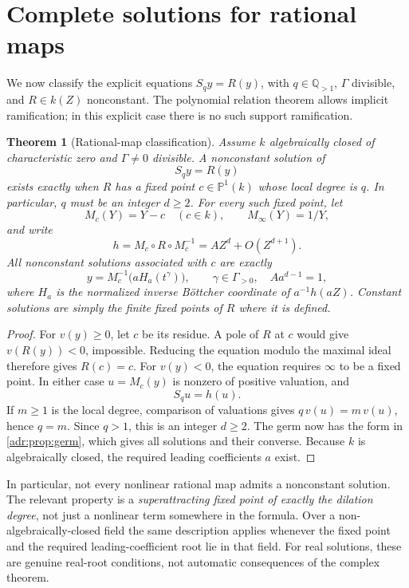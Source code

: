 \documentclass[11pt,letterpaper]{article}
\numberwithin{equation}{section}
\newtheorem{theorem}{Theorem}[section]
\theoremstyle{definition}
\theoremstyle{remark}
\newcommand{\Q}{\mathbb Q}
\begin{document}
\section{Complete solutions for rational maps}\label{adr:sec:rational}

We now classify the explicit equations $S_qy=R(y)$, with
$q\in\Q_{>1}$, $\Gamma$ divisible, and $R\in k(Z)$ nonconstant.
The polynomial relation theorem allows implicit ramification; in this
explicit case there is no such support ramification.

\begin{theorem}[Rational-map classification]\label{adr:thm:rational}
Assume $k$ algebraically closed of characteristic zero and $\Gamma\ne0$
divisible. A nonconstant solution of
\begin{equation}\label{adr:eq:rational}
 S_qy=R(y)
\end{equation}
exists exactly when $R$ has a fixed point $c\in\mathbb P^1(k)$ whose
local degree is $q$. In particular, $q$ must be an integer $d\ge2$.
For every such fixed point, let
\[
 M_c(Y)=Y-c\quad(c\in k),\qquad M_\infty(Y)=1/Y,
\]
and write
\[
 h=M_c\circ R\circ M_c^{-1}
   =A Z^d+O(Z^{d+1}).
\]
All nonconstant solutions associated with $c$ are exactly
\begin{equation}\label{adr:eq:rational-solutions}
 y=M_c^{-1}\bigl(aH_a(t^\gamma)\bigr),
 \qquad \gamma\in\Gamma_{>0},\quad Aa^{d-1}=1,
\end{equation}
where $H_a$ is the normalized inverse B\"ottcher coordinate of
$a^{-1}h(aZ)$. Constant solutions are simply the finite fixed points of
$R$ where it is defined.
\end{theorem}
\begin{proof}
For $v(y)\ge0$, let $c$ be its residue. A pole of $R$ at $c$ would give
$v(R(y))<0$, impossible. Reducing the equation modulo the maximal ideal
therefore gives $R(c)=c$. For $v(y)<0$, the equation requires $\infty$
to be a fixed point. In either case $u=M_c(y)$ is nonzero of positive
valuation, and
\[
 S_qu=h(u).
\]
If $m\ge1$ is the local degree, comparison of valuations gives
$q\,v(u)=m\,v(u)$, hence $q=m$. Since $q>1$, this is an integer $d\ge2$.
The germ now has the form in \cref{adr:prop:germ}, which gives all solutions
and their converse. Because $k$ is algebraically closed, the required
leading coefficients $a$ exist.
\end{proof}

In particular, not every nonlinear rational map admits a nonconstant
solution. The relevant property is a \emph{superattracting fixed point
of exactly the dilation degree}, not just a nonlinear term somewhere
in the formula. Over a non-algebraically-closed field the same description
applies whenever the fixed point and the required leading-coefficient
root lie in that field. For real solutions, these are genuine real-root
conditions, not automatic consequences of the complex theorem.
\end{document}

